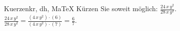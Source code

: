 \begin{MAufgabe}{Kuerzen}{kr, dh, MaTeX}
K\"urzen Sie soweit m\"oglich: $\frac{24\, x\, y^2}{28\, x\, y^2}$.\\ 
\ifLsg\MLoesung
\quad $\frac{24\, x\, y^2}{28\, x\, y^2}=\frac{(4\, x\, y^2)\cdot(6)}{(4\, x\, y^2)\cdot(7)}=\frac{6}{7}$.\else\relax\fi
 \end{MAufgabe}